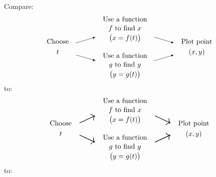 \documentclass[oneside]{book}
\begin{document}
Compare: %
\[
\begin{gathered}\text{Choose}\\t\end{gathered}\quad
\tikz[>=latex,baseline=(current bounding box.center)]{\draw[->](0,.3)--(1,.6);\draw[->](0,-.3)--(1,-.6);}\quad
{\addtolength{\jot}{-.5ex}
\begin{gathered}
\text{Use a function}\\f\text{ to find }x\\\bigl(x=f(t)\bigr)\\~\\
\text{Use a function}\\g\text{ to find }y\\\bigl(y=g(t)\bigr)
\end{gathered}
}\quad
\tikz[>=latex,baseline=(current bounding box.center)]{\draw[->](0,.6)--(1,.3);\draw[->](0,-.6)--(1,-.3);}\quad
\begin{gathered}\text{Plot point}\\(x,y)\end{gathered}
\]
to:
\[
\begin{gathered}\text{Choose}\\t\end{gathered}\quad
\begin{gathered}
\rotatebox{-20}{\scalebox{2}{$\nearrow$}}\\
\rotatebox{20}{\scalebox{2}{$\searrow$}}
\end{gathered}\quad
{\addtolength{\jot}{-.5ex}
\begin{gathered}
\text{Use a function}\\f\text{ to find }x\\\bigl(x=f(t)\bigr)\\~\\
\text{Use a function}\\g\text{ to find }y\\\bigl(y=g(t)\bigr)
\end{gathered}
}\quad
\begin{gathered}
\rotatebox{20}{\scalebox{2}{$\searrow$}}\\
\rotatebox{-20}{\scalebox{2}{$\nearrow$}}
\end{gathered}\quad
\begin{gathered}\text{Plot point}\\(x,y)\end{gathered}
\]
to:
\begin{center}
\end{center}
\end{document}
